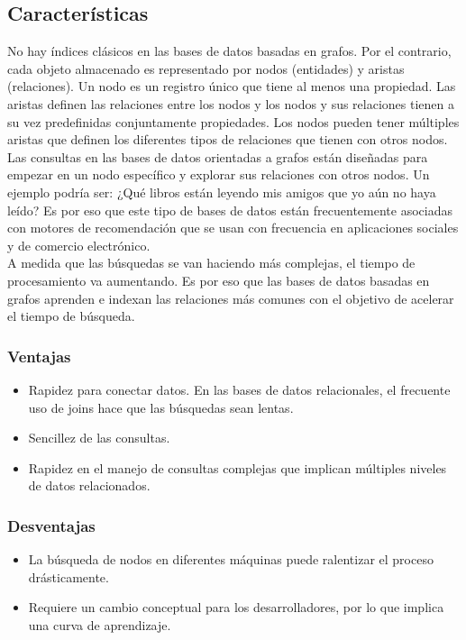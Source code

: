 	\subsection{Características}
		No hay índices clásicos en las bases de datos basadas en grafos. Por el contrario, cada objeto almacenado es representado por nodos (entidades) y aristas (relaciones). Un nodo es un registro único que tiene al menos una propiedad. Las aristas definen las relaciones entre los nodos y los nodos y sus relaciones tienen a su vez predefinidas conjuntamente propiedades. Los nodos pueden tener múltiples aristas que definen los diferentes tipos de relaciones que tienen con otros nodos.
		\newpage
		Las consultas en las bases de datos orientadas a grafos están diseñadas para empezar en un nodo específico y explorar sus relaciones con otros nodos. Un ejemplo podría ser: ¿Qué libros están leyendo mis amigos que yo aún no haya leído? Es por eso que este tipo de bases de datos están frecuentemente asociadas con motores de recomendación que se usan con frecuencia en aplicaciones sociales y de comercio electrónico.\\

		A medida que las búsquedas se van haciendo más complejas, el tiempo de procesamiento va aumentando. Es por eso que las bases de datos basadas en grafos aprenden e indexan las relaciones más comunes con el objetivo de acelerar el tiempo de búsqueda. 
		\subsubsection{Ventajas}
		\begin{itemize}
		 \item Rapidez para conectar datos. En las bases de datos relacionales, el frecuente uso de joins hace que las búsquedas sean lentas.
		 \item Sencillez de las consultas.
		 \item Rapidez en el manejo de consultas complejas que implican múltiples niveles de datos relacionados.
		\end{itemize}
		\subsubsection{Desventajas}
		\begin{itemize}
		 \item La búsqueda de nodos en diferentes máquinas puede ralentizar el proceso drásticamente.
		 \item Requiere un cambio conceptual para los desarrolladores, por lo que implica una curva de aprendizaje.
		\end{itemize}\cite{9}


